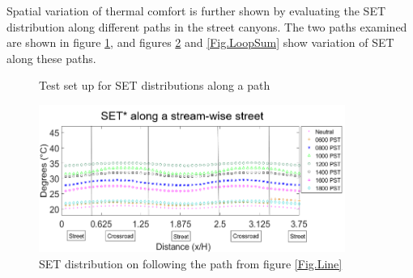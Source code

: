 \documentclass[preprint,3p,12pt,english]{elsarticle}
\begin{document}
Spatial variation of thermal comfort is further shown by evaluating the SET distribution along different paths in the street canyons.  The two paths examined are shown in figure \ref{Fig.Paths}, and figures \ref{Fig.LineSum} and \ref{Fig.LoopSum} show variation of SET along these paths.

\begin{figure}[H] \centering  
\graphicspath{ {image/} }
\hskip 0.5in
\hskip 0.5in 
\caption{Test set up for SET distributions along a path} 
\label{Fig.Paths}
\end{figure}

\begin{figure}[H]
\graphicspath{ {image/} }
\centerline{\includegraphics[width=10cm]{line_sum.png}}
\caption{SET distribution on following the path from figure  \ref{Fig.Line}}
\label{Fig.LineSum}
\end{figure}
\end{document}
